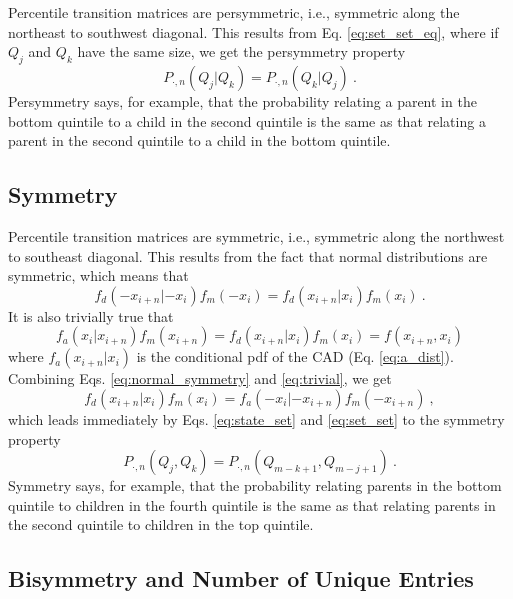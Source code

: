\documentclass{svproc} %
\begin{document}
Percentile transition matrices are persymmetric, i.e., symmetric along the northeast to southwest diagonal. This results from Eq. \ref{eq:set_set_eq}, where if $Q_j$ and $Q_k$ have the same size, we get the persymmetry property
\begin{equation}
P_{ \cdot, n}(Q_j | Q_k) = P_{\cdot, n}(Q_k | Q_j) \ .
\label{eq:persymmetry}
\end{equation}
Persymmetry says, for example, that the probability relating a parent in the bottom quintile to a child in the second quintile is the same as that relating a parent in the second quintile to a child in the bottom quintile.


\subsection{Symmetry}

Percentile transition matrices are symmetric, i.e., symmetric along the northwest to southeast diagonal. This results from the fact that normal distributions are symmetric, which means that 
\begin{equation}
f_d(-x_{i+n} | -x_i) f_m(-x_i) = f_d(x_{i+n} | x_i) f_m(x_i) \ .
\label{eq:normal_symmetry}
\end{equation} 
It is also trivially true that 
\begin{equation}
f_a(x_i | x_{i+n}) f_m(x_{i+n}) = f_d(x_{i+n} | x_i) f_m(x_i) = f(x_{i+n} , x_i)
\label{eq:trivial}
\end{equation}
where $f_a(x_{i+n}|x_i)$ is the conditional pdf of the CAD (Eq. \ref{eq:a_dist}).
Combining Eqs. \ref{eq:normal_symmetry} and \ref{eq:trivial}, we get 
\begin{equation}
f_d(x_{i+n}|x_i)f_m(x_i) = f_a(-x_i|-x_{i+n})f_m(-x_{i+n}) \ , 
\end{equation} 
which leads immediately by Eqs. \ref{eq:state_set} and \ref{eq:set_set} to the symmetry property 
\begin{equation}
P_{ \cdot, n}(Q_j, Q_k) = P_{\cdot, n}(Q_{m-k+1}, Q_{m-j+1}) \ .
\label{eq:symmetry}
\end{equation}
Symmetry says, for example, that the probability relating parents in the bottom quintile to children in the fourth quintile is the same as that relating parents in the second quintile to children in the top quintile. 

\subsection{Bisymmetry and Number of Unique Entries} \label{bisymmetry}
\end{document}
